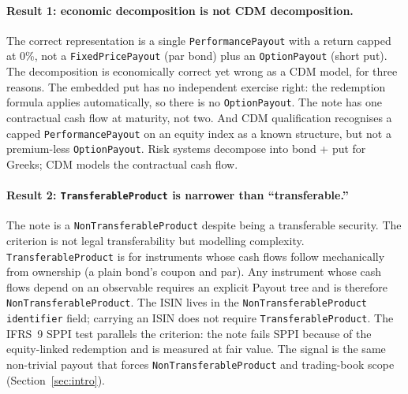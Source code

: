 \paragraph{Result 1: economic decomposition is not CDM decomposition.} The correct representation is a single \texttt{PerformancePayout} with a return capped at 0\%, not a \texttt{FixedPricePayout} (par bond) plus an \texttt{OptionPayout} (short put). The decomposition is economically correct yet wrong as a CDM model, for three reasons. The embedded put has no independent exercise right: the redemption formula applies automatically, so there is no \texttt{OptionPayout}. The note has one contractual cash flow at maturity, not two. And CDM qualification recognises a capped \texttt{PerformancePayout} on an equity index as a known structure, but not a premium-less \texttt{OptionPayout}. Risk systems decompose into bond + put for Greeks; CDM models the contractual cash flow.

\paragraph{Result 2: \texttt{Transferable\allowbreak Product} is narrower than ``transferable.''} The note is a \texttt{Non\allowbreak Transferable\allowbreak Product} despite being a transferable security. The criterion is not legal transferability but modelling complexity. \texttt{Transferable\allowbreak Product} is for instruments whose cash flows follow mechanically from ownership (a plain bond's coupon and par). Any instrument whose cash flows depend on an observable requires an explicit Payout tree and is therefore \texttt{Non\allowbreak Transferable\allowbreak Product}. The ISIN lives in the \texttt{Non\allowbreak Transferable\allowbreak Product} \texttt{identifier} field; carrying an ISIN does not require \texttt{Transferable\allowbreak Product}. The IFRS~9 SPPI test parallels the criterion: the note fails SPPI because of the equity-linked redemption and is measured at fair value. The signal is the same non-trivial payout that forces \texttt{Non\allowbreak Transferable\allowbreak Product} and trading-book scope (Section~\ref{sec:intro}).

